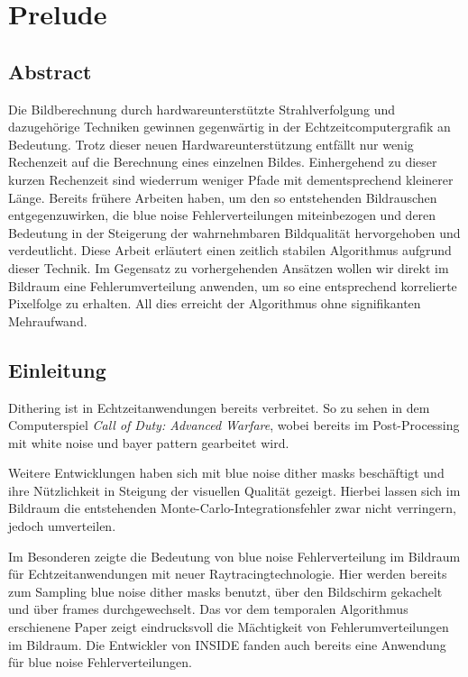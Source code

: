 

\chapter{Prelude}
\label{ch:Introduction}

\section{Abstract}

\vspace*{\fill}

Die Bildberechnung durch hardwareunterstützte Strahlverfolgung und dazugehörige Techniken gewinnen gegenwärtig in der Echtzeitcomputergrafik an Bedeutung. 
Trotz dieser neuen Hardwareunterstützung entfällt nur wenig Rechenzeit auf die Berechnung eines
einzelnen Bildes. Einhergehend zu dieser kurzen Rechenzeit sind wiederrum weniger Pfade mit dementsprechend kleinerer
Länge. Bereits frühere Arbeiten haben, um den so entstehenden Bildrauschen entgegenzuwirken,
die blue noise Fehlerverteilungen miteinbezogen und deren Bedeutung in der Steigerung der wahrnehmbaren Bildqualität hervorgehoben und verdeutlicht.
Diese Arbeit erläutert einen zeitlich stabilen Algorithmus aufgrund dieser Technik. Im Gegensatz zu vorhergehenden Ansätzen wollen wir direkt im Bildraum eine Fehlerumverteilung anwenden, um so eine entsprechend 
korrelierte Pixelfolge zu erhalten. All dies erreicht der Algorithmus ohne signifikanten Mehraufwand.
\vfill

\newpage

\section{Einleitung}
\vspace*{\fill}
Dithering ist in Echtzeitanwendungen bereits verbreitet. So zu sehen in dem Computerspiel \textit{Call of Duty: Advanced Warfare}, wobei 
bereits im Post-Processing \cite{callofdutypostprocessing} mit white noise und bayer pattern gearbeitet wird.\par 
Weitere Entwicklungen \cite{georgiev2016blue} haben sich mit blue noise dither masks  beschäftigt
und ihre Nützlichkeit in Steigung der visuellen Qualität gezeigt. Hierbei lassen sich im Bildraum die entstehenden 
Monte-Carlo-Integrationsfehler  zwar nicht verringern, jedoch umverteilen.\par 
Im Besonderen zeigte \cite{Sch19} die Bedeutung von blue noise Fehlerverteilung im Bildraum für Echtzeitanwendungen mit neuer
Raytracingtechnologie. Hier werden bereits zum Sampling blue noise dither masks 
benutzt, über den Bildschirm \dq gekachelt \dq und über frames durchgewechselt.
Das vor dem temporalen Algorithmus erschienene Paper \cite{heitz:hal02150657} zeigt eindrucksvoll die Mächtigkeit von 
Fehlerumverteilungen im Bildraum. 
Die Entwickler von INSIDE \cite{10.111712.152707} fanden auch bereits eine Anwendung für blue noise Fehlerverteilungen. 


